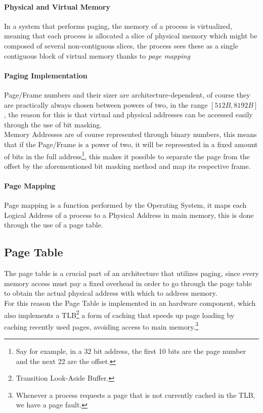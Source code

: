 \documentclass[openright, twoside]{report}
\theoremstyle{definition}
\theoremstyle{example}
\begin{document}
\paragraph{Physical and Virtual Memory}
In a system that performs paging, the memory of a process 
is virtualized, meaning that each process is allocated a 
slice of physical memory which might be composed of several 
non-contiguous slices, the process sees these as a single contiguous 
block of virtual memory thanks to \emph{page mapping}


\paragraph{Paging Implementation}
Page/Frame numbers and their sizer are architecture-dependent, of course 
they are practically always chosen between powers of two, in the range
$[512B, 8192B]$, the reason for this is that virtual and physical addresses 
can be accessed easily through the use of bit masking.\\ 

Memory Addresses are of course represented through binary numbers,
this means that if the Page/Frame is a power of two, it will be 
represented in a fixed amount of bits in the full address\footnote{Say for example, in a
32 bit address, the first 10 bits are the page number and the next 22 are the offset.}, this 
makes it possible to separate the page from the offset by the aforementioned 
bit masking method and map its respective frame.

\paragraph{Page Mapping}
Page mapping is a function performed by the Operating System, 
it maps each Logical Address of a process to a Physical Address
in main memory, this is done through the use of a page table. 

\subsection{Page Table}
The page table is a crucial part of an architecture that utilizes 
paging, since every memory access must pay a fixed overhead in order 
to go through the page table to obtain the actual physical address with 
which to address memory.\\

For this reason the Page Table is implemented in an hardware component, which 
also implements a TLB\footnote{Transition Look-Aside Buffer.}
a form of caching that speeds up page loading by caching recently used pages, 
avoiding access to main memory.\footnote{Whenever a process requests a page that is not currently cached in the TLB, we have 
a page fault.}
\end{document}
